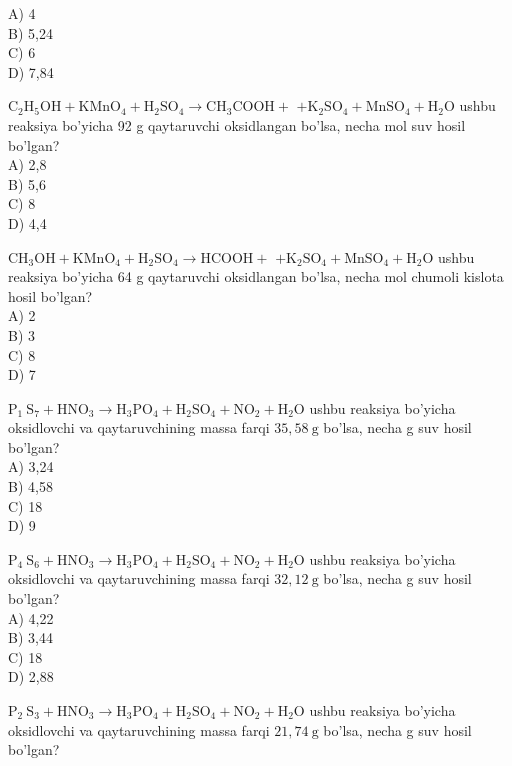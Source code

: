 A) 4\\
B) 5,24\\
C) 6\\
D) 7,84
  \item $\mathrm{C}_{2} \mathrm{H}_{5} \mathrm{OH}+\mathrm{KMnO}_{4}+\mathrm{H}_{2} \mathrm{SO}_{4} \rightarrow \mathrm{CH}_{3} \mathrm{COOH}+$ $+\mathrm{K}_{2} \mathrm{SO}_{4}+\mathrm{MnSO}_{4}+\mathrm{H}_{2} \mathrm{O}$ ushbu reaksiya bo'yicha 92 g qaytaruvchi oksidlangan bo'lsa, necha mol suv hosil bo'lgan?\\
A) 2,8\\
B) 5,6\\
C) 8\\
D) 4,4
  \item $\mathrm{CH}_{3} \mathrm{OH}+\mathrm{KMnO}_{4}+\mathrm{H}_{2} \mathrm{SO}_{4} \rightarrow \mathrm{HCOOH}+$ $+\mathrm{K}_{2} \mathrm{SO}_{4}+\mathrm{MnSO}_{4}+\mathrm{H}_{2} \mathrm{O}$ ushbu reaksiya bo'yicha 64 g qaytaruvchi oksidlangan bo'lsa, necha mol chumoli kislota hosil bo'lgan?\\
A) 2\\
B) 3\\
C) 8\\
D) 7
  \item $\mathrm{P}_{1} \mathrm{~S}_{7}+\mathrm{HNO}_{3} \rightarrow \mathrm{H}_{3} \mathrm{PO}_{4}+\mathrm{H}_{2} \mathrm{SO}_{4}+\mathrm{NO}_{2}+\mathrm{H}_{2} \mathrm{O}$ ushbu reaksiya bo'yicha oksidlovchi va qaytaruvchining massa farqi $35,58 \mathrm{~g}$ bo'lsa, necha g suv hosil bo'lgan?\\
A) 3,24\\
B) 4,58\\
C) 18\\
D) 9
  \item $\mathrm{P}_{4} \mathrm{~S}_{6}+\mathrm{HNO}_{3} \rightarrow \mathrm{H}_{3} \mathrm{PO}_{4}+\mathrm{H}_{2} \mathrm{SO}_{4}+\mathrm{NO}_{2}+\mathrm{H}_{2} \mathrm{O}$ ushbu reaksiya bo'yicha oksidlovchi va qaytaruvchining massa farqi $32,12 \mathrm{~g}$ bo'lsa, necha g suv hosil bo'lgan?\\
A) 4,22\\
B) 3,44\\
C) 18\\
D) 2,88
  \item $\mathrm{P}_{2} \mathrm{~S}_{3}+\mathrm{HNO}_{3} \rightarrow \mathrm{H}_{3} \mathrm{PO}_{4}+\mathrm{H}_{2} \mathrm{SO}_{4}+\mathrm{NO}_{2}+\mathrm{H}_{2} \mathrm{O}$ ushbu reaksiya bo'yicha oksidlovchi va qaytaruvchining massa farqi $21,74 \mathrm{~g}$ bo'lsa, necha g suv hosil bo'lgan?\\
